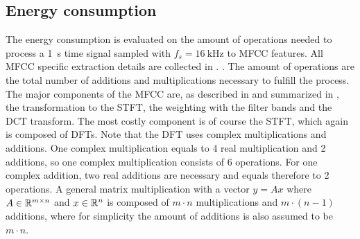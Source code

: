 
\subsection{Energy consumption}
The energy consumption is evaluated on the amount of operations needed to process a \SI{1}{\second} time signal sampled with $f_s = \SI{16}{\kilo\hertz}$ to MFCC features.
All MFCC specific extraction details are collected in .
.
The amount of operations are the total number of additions and multiplications necessary to fulfill the process.
The major components of the MFCC are, as described in  and summarized in , the transformation to the STFT, the weighting with the filter bands and the DCT transform.
The most costly component is of course the STFT, which again is composed of DFTs.
Note that the DFT uses complex multiplications and additions.
One complex multiplication equals to 4 real multiplication and 2 additions, so one complex multiplication consists of 6 operations.
For one complex addition, two real additions are necessary and equals therefore to 2 operations.
A general matrix multiplication with a vector $y = Ax$ where $A \in \mathbb{R}^{m \times n}$ and $x \in \mathbb{R}^n$ is composed of $m \cdot n$ multiplications and $m \cdot (n - 1)$ additions, where for simplicity the amount of additions is also assumed to be $m \cdot n$.

